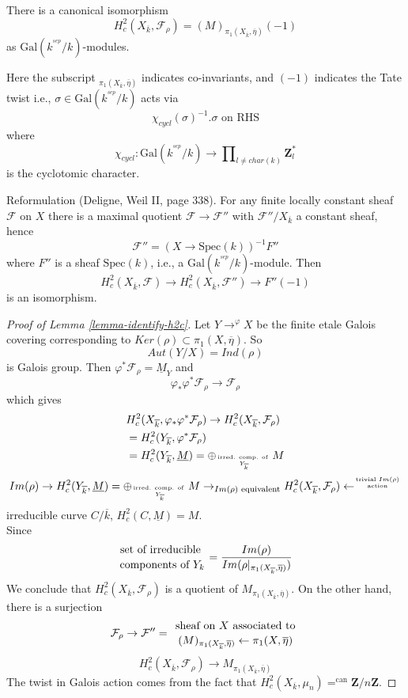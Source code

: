 \begin{lemma}
\label{lemma-identify-h2c}
There is a canonical isomorphism
$$
H_c^2(X_{\overline k}, \mathcal{F}_\rho)=(M)_{\pi_1(X_{\overline k},
\overline\eta)}(-1)
$$
as $\text{Gal}(k^{^{sep}}/k)$-modules.
\end{lemma}

\noindent
Here the subscript ${}_{\pi_1(X_{\overline k}, \overline\eta)}$
indicates co-invariants, and $(-1)$ indicates the Tate twist i.e.,
$\sigma\in \text{Gal}(k^{^{sep}}/k)$ acts via
$$
\chi_{cycl}(\sigma)^{-1}.\sigma\text{ on RHS}
$$
where
$$
\chi_{cycl} :
\text{Gal}(k^{^{sep}}/k)
\to
\prod\nolimits_{l\neq char(k)}\mathbf{Z}_l^*
$$
is the cyclotomic character.

\medskip\noindent
Reformulation (Deligne, Weil II, page 338). For any finite locally
constant sheaf $\mathcal{F}$ on $X$ there is a maximal quotient $\mathcal{F}\to
\mathcal{F}''$ with $\mathcal{F}''/X_{\overline k}$ a constant sheaf, hence
$$\mathcal{F}'' = (X\to \text{Spec}(k))^{-1}F''$$
where $F''$ is a sheaf $\text{Spec}(k)$, i.e., a
$\text{Gal}(k^{^{sep}}/k)$-module. Then
$$H_c^2(X_{\overline k}, \mathcal{F})\to H_c^2(X_{\overline k},
\mathcal{F}'')\to F''(-1)$$
is an isomorphism.

\begin{proof}[Proof of Lemma \ref{lemma-identify-h2c}]
Let $Y\to^{\varphi}X$ be the finite etale Galois covering
corresponding to $Ker(\rho)\subset \pi_1(X, \overline\eta)$. So
$$Aut(Y/X)=Ind(\rho)$$
is Galois group. Then $\varphi^*\mathcal{F}_\rho =\underline M_Y$ and
$$\varphi_*\varphi^*\mathcal{F}_\rho\to \mathcal{F}_\rho$$
which gives
\begin{align*}
&H_c^2(X_{\overline k}, \varphi_*\varphi^*\mathcal{F}_\rho) \to
H_c^2(X_{\overline k}, \mathcal{F}_\rho)\\
&=H_c^2(Y_{\overline k}, \varphi^*\mathcal{F}_\rho)\\
&=H_c^2(Y_{\overline k}, \underline M) = \oplus_{\text{irred.
comp. of }\atop Y_{\overline k}}M
\end{align*}
$$Im(\rho)\rightarrow H_c^2(Y_{\overline k}, \underline M) =
\oplus_{\text{irred. comp. of }\atop Y_{\overline k}}M\to_{Im(\rho)\text{
equivalent}} H_c^2(X_{\overline k},
\mathcal{F}_{\rho})\leftarrow^{\text{trivial }Im(\rho)\atop \text{action}}$$
irreducible curve $C/\overline k$, $H_c^2(C, \underline M)=M$.
\\
Since
$${\text{set of irreducible }\atop\text{components of }Y_k} =
\frac{Im(\rho)}{Im(\rho|_{\pi_1(X_{\overline k}, \overline \eta)})}$$
We conclude that $H_c^2(X_{\overline k}, \mathcal{F}_\rho)$ is a
quotient of $M_{\pi_1(X_{\overline k}, \overline \eta)}$. On the other hand,
there is a surjection
$$\mathcal{F}_\rho\to \mathcal{F}'' = {\text{ sheaf on }
X\text{ associated to }\atop (M)_{\pi_1(X_{\overline k}, \overline
\eta)}\leftarrow\pi_1(X, \overline \eta)}$$
$$H_c^2(X_{\overline k}, \mathcal{F}_\rho)\to
M_{\pi_1(X_{\overline k}, \overline\eta)}$$
The twist in Galois action comes from the fact that
$H_c^2(X_{\overline k}, \mu_n)=^{\text{can}} \mathbf{Z}/n\mathbf{Z}$.
\end{proof}

